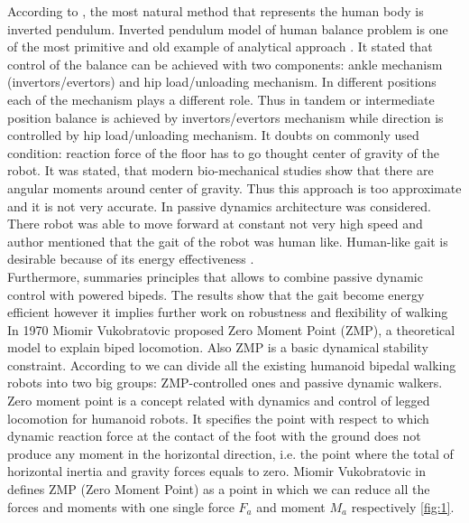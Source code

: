 \documentclass[12pt,a4paper]{report}
\begin{document}
		According to \cite{tang2008analysis}, the most natural method that represents the human body is inverted pendulum.
		Inverted pendulum model of human balance problem is one of the most primitive and old example of analytical approach \cite{winter1995human}. It stated that control of the balance can be achieved with two components: ankle mechanism (invertors/evertors) and hip load/unloading mechanism. In different positions each of the mechanism plays a different role. Thus in tandem or intermediate position balance is achieved by invertors/evertors mechanism while direction is controlled by hip load/unloading mechanism. It doubts on commonly used condition: reaction force of the floor has to go thought center of gravity of the robot. It was stated, that modern bio-mechanical studies show that there are angular moments around center of gravity. 
		Thus this approach is too approximate and it is not very accurate. In \cite{collins2005bipedal} passive dynamics architecture was considered. There robot was able to move forward at constant not very high speed and author mentioned that the gait of the robot was human like. Human-like gait is desirable because of its energy effectiveness \cite{golliday1977approach}.\\
		Furthermore, \cite{anderson2005powered} summaries principles that allows to combine passive dynamic control with powered bipeds. The results show that the gait become energy efficient however it implies further work on robustness and flexibility of walking\\

		In 1970 Miomir Vukobratovic proposed Zero Moment Point (ZMP), a theoretical model to explain biped locomotion. Also ZMP is a basic dynamical stability constraint.
		According to \cite{manchester2011stable} we can divide all the existing humanoid bipedal walking robots into two big groups: ZMP-controlled ones and passive dynamic walkers.\\
		Zero moment point is a concept related with dynamics and control of legged locomotion for humanoid robots. It specifies the point with respect to which dynamic reaction force at the contact of the foot with the ground does not produce any moment in the horizontal direction, i.e. the point where the total of horizontal inertia and gravity forces equals to zero.
		Miomir Vukobratovic in \cite{vukobratovic2004zero} defines ZMP (Zero Moment Point) as a point in which we can reduce all the forces and moments with one single force $F_a$ and moment $M_a$ respectively  \cref{fig:1}.
	
\end{document}
